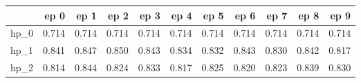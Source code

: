 \begin{tabular}{lrrrrrrrrrr}
\toprule
{} &   ep 0 &   ep 1 &   ep 2 &   ep 3 &   ep 4 &   ep 5 &   ep 6 &   ep 7 &   ep 8 &   ep 9 \\
\midrule
hp\_0 &  0.714 &  0.714 &  0.714 &  0.714 &  0.714 &  0.714 &  0.714 &  0.714 &  0.714 &  0.714 \\
hp\_1 &  0.841 &  0.847 &  0.850 &  0.843 &  0.834 &  0.832 &  0.843 &  0.830 &  0.842 &  0.817 \\
hp\_2 &  0.814 &  0.844 &  0.824 &  0.833 &  0.817 &  0.825 &  0.820 &  0.823 &  0.839 &  0.830 \\
\bottomrule
\end{tabular}
